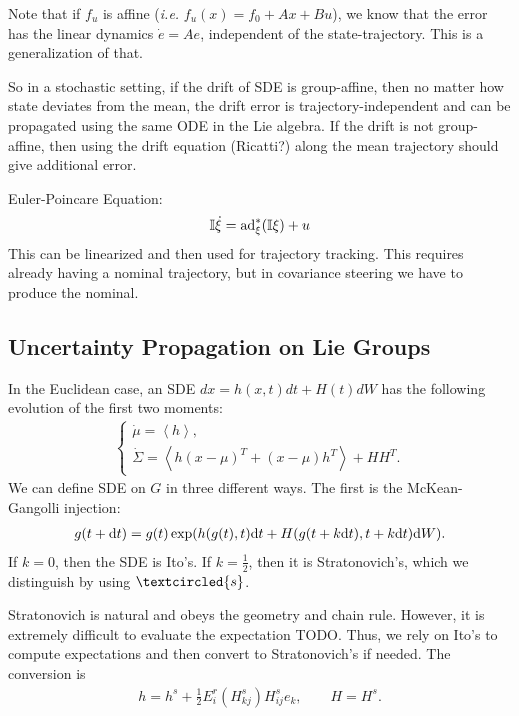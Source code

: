 \documentclass[12pt,class=article,crop=false]{standalone}
\begin{document}
Note that if $ f_u$ is affine (\emph{i.e.} $ f_u(x) = f_0 + Ax + Bu$), we know that the error has the linear dynamics  $ \dot{e} = A e$, independent of the state-trajectory. This is a generalization of that.

So in a stochastic setting, if the drift of SDE is group-affine, then no matter how state deviates from the mean, the drift error is trajectory-independent and can be propagated using the same ODE in the Lie algebra. If the drift is not group-affine, then using the drift equation (Ricatti?) along the mean trajectory should give additional error.

Euler-Poincare Equation:
\begin{align*}
	\mathbb{I} \dot{\xi} = \operatorname{ad}_{ \xi}^* ( \mathbb{I} \xi) + u 
\end{align*}
This can be linearized and then used for trajectory tracking. This requires already having a nominal trajectory, but in covariance steering we have to produce the nominal.

\subsection{Uncertainty Propagation on Lie Groups}

In the Euclidean case, an SDE $ dx = h(x,t) dt + H(t) dW$ has the following evolution of the first two moments:
 \begin{align*}
	\begin{cases}
		 \dot{\mu} = \left\langle h \right\rangle ,\\
		 \dot{\Sigma} = \left\langle h (x-\mu)^{T} + (x-\mu) h^{T} \right\rangle + HH^{T} .
	\end{cases}
\end{align*}
We can define SDE on $ G$ in three different ways. The first is the McKean-Gangolli injection:
 \begin{align*}
	g(t+ \mathrm{d} t) = g(t) \exp( h(g(t),t) \mathrm{d} t + H(g(t+k\mathrm{d} t), t+k\mathrm{d} t) \mathrm{d} W) .
\end{align*}
If $ k=0$, then the SDE is Ito's. If  $ k=\frac{1}{2}$, then it is Stratonovich's, which we distinguish by using $ \textcircled{s}$.

Stratonovich is natural and obeys the geometry and chain rule. However, it is extremely difficult to evaluate the expectation TODO. Thus, we rely on Ito's to compute expectations and then convert to Stratonovich's if needed. The conversion is
\begin{align*}
	h = h^s + \frac{1}{2} E_i^r\left( H_{kj}^s \right) H_{ij}^s e_k , \qquad H = H^s .
\end{align*}
\end{document}
